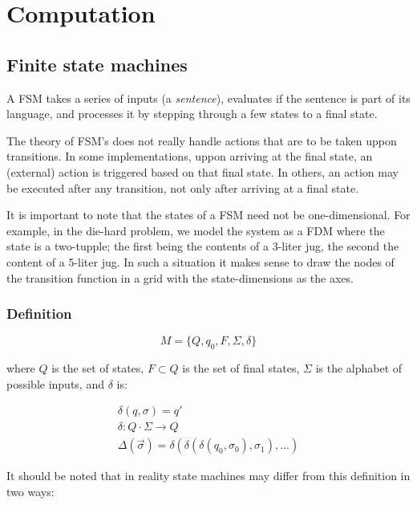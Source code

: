 \section{Computation}

\subsection{Finite state machines}

A FSM takes a series of inputs (a \emph{sentence}), evaluates if the sentence is part of its language, and processes it by stepping through a few states to a final state. 

The theory of FSM's does not really handle actions that are to be taken uppon transitions. In some implementations, uppon arriving at the final state, an (external) action is triggered based on that final state. In others, an action may be executed after any transition, not only after arriving at a final state.

 It is important to note that the states of a FSM need not be one-dimensional. For example, in the die-hard problem, we model the system as a FDM where the state is a two-tupple; the first being the contents of a 3-liter jug, the second the content of a 5-liter jug. In such a situation it makes sense to draw the nodes of the transition function in a grid with the state-dimensions as the axes.

\subsubsection{Definition}

\begin{equation}
M = \{ Q, q_0, F, \Sigma, \delta \}    
\end{equation} 

where $Q$ is the set of states, $F \subset Q$ is the set of final states, $\Sigma$ is the alphabet of possible inputs, and $\delta$ is:

\begin{align}
 \delta(q, \sigma) = q' \\
 \delta : Q \cdot \Sigma \to Q \\
 \Delta(\vec{\sigma}) = \delta( \delta( \delta( q_0, \sigma_0 ), \sigma_1 ), ... ) 
\end{align}

It should be noted that in reality state machines may differ from this definition in two ways:

